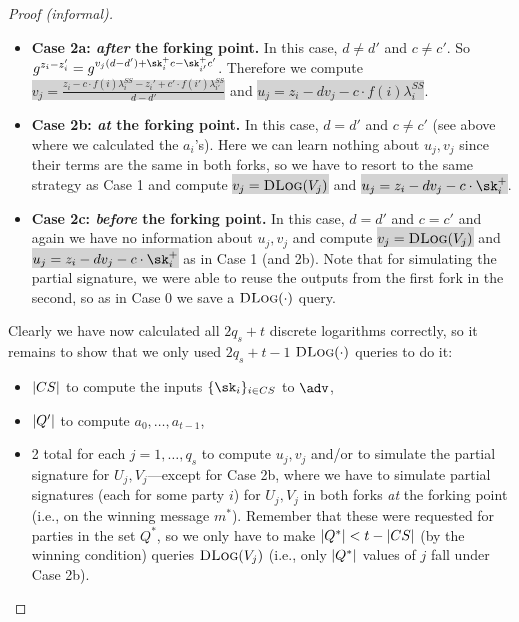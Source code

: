\begin{proof}[Proof (informal)]
\begin{itemize}
    \item \textbf{Case 2a: \emph{after} the forking point.} In this case, $d \neq d'$ and $c \neq c'$. So $g^{z_i - z_i'} = g^{v_j(d-d') + \sk_i^+ c - \sk_{i'}^+ c'}$. Therefore we compute \colorbox{lightgray}{$v_j = \frac{z_i - c \cdot f(i) \lambda_i^{SS} - z_i' + c' \cdot f(i') \lambda_{i'}^{SS}}{d-d'}$} and \colorbox{lightgray}{$u_j = z_i - d v_j - c \cdot f(i) \lambda_i^{SS}$}.
    \item \textbf{Case 2b: \emph{at} the forking point.} In this case, $d = d'$ and $c \neq c'$ (see above where we calculated the $a_i$'s). Here we can learn nothing about $u_j, v_j$ since their terms are the same in both forks, so we have to resort to the same strategy as Case 1 and compute \colorbox{lightgray}{$v_j = \textsc{DLog}(V_j)$} and \colorbox{lightgray}{$u_j = z_i - dv_j - c \cdot \sk_i^+$}.
    \item \textbf{Case 2c: \emph{before} the forking point.} In this case, $d = d'$ and $c=c'$ and again we have no information about $u_j, v_j$ and compute \colorbox{lightgray}{$v_j = \textsc{DLog}(V_j)$} and \colorbox{lightgray}{$u_j = z_i - dv_j - c \cdot \sk_i^+$} as in Case 1 (and 2b). Note that for simulating the partial signature, we were able to reuse the outputs from the first fork in the second, so as in Case 0 we save a $\textsc{DLog}(\cdot)$ query.
\end{itemize}

Clearly we have now calculated all $2q_s + t$ discrete logarithms correctly, so it remains to show that we only used $2q_s + t - 1$ $\textsc{DLog}(\cdot)$ queries to do it:

\begin{itemize}
    \item $\lvert CS \rvert$ to compute the inputs $\{\sk_i\}_{i \in CS}$ to $\adv$,
    \item $\lvert Q' \rvert$ to compute $a_0, \dots, a_{t-1}$,
    \item 2 total for each $j=1, \dots, q_s$ to compute $u_j, v_j$ and/or to simulate the partial signature for $U_j, V_j$---except for Case 2b, where we have to simulate partial signatures (each for some party $i$) for $U_j, V_j$ in both forks \emph{at} the forking point (i.e., on the winning message $m^*$). Remember that these were requested for parties in the set $Q^*$, so we only have to make $\lvert Q^* \rvert < t - \lvert {\ensuremath{CS}} \rvert$ (by the winning condition) queries $\textsc{DLog}(V_j)$ (i.e., only $\lvert Q^* \rvert$ values of $j$ fall under Case 2b).
\end{itemize}


\end{proof}
